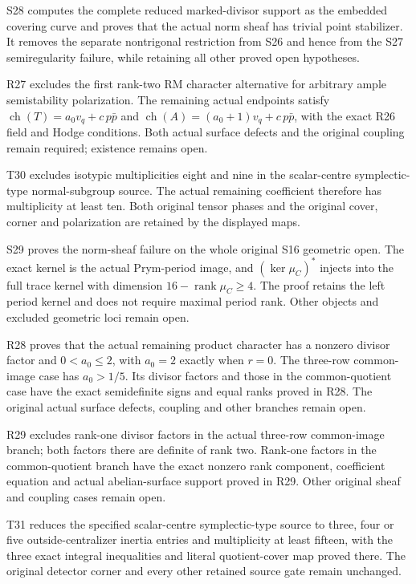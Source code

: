 S28 computes the complete reduced marked-divisor support as the embedded covering curve and proves that the actual norm sheaf has trivial point stabilizer. It removes the separate nontrigonal restriction from S26 and hence from the S27 semiregularity failure, while retaining all other proved open hypotheses.




R27 excludes the first rank-two RM character alternative for arbitrary ample semistability polarization. The remaining actual endpoints satisfy $\operatorname{ch}(T)=a_0v_q+c\,p\bar p$ and $\operatorname{ch}(A)=(a_0+1)v_q+c\,p\bar p$, with the exact R26 field and Hodge conditions. Both actual surface defects and the original coupling remain required; existence remains open.




T30 excludes isotypic multiplicities eight and nine in the scalar-centre symplectic-type normal-subgroup source. The actual remaining coefficient therefore has multiplicity at least ten. Both original tensor phases and the original cover, corner and polarization are retained by the displayed maps.




S29 proves the norm-sheaf failure on the whole original S16 geometric open. The exact kernel is the actual Prym-period image, and $(\ker\mu_C)^*$ injects into the full trace kernel with dimension $16-\operatorname{rank}\mu_C\ge4$. The proof retains the left period kernel and does not require maximal period rank. Other objects and excluded geometric loci remain open.




R28 proves that the actual remaining product character has a nonzero divisor factor and $0<a_0\le2$, with $a_0=2$ exactly when $r=0$. The three-row common-image case has $a_0>1/5$. Its divisor factors and those in the common-quotient case have the exact semidefinite signs and equal ranks proved in R28. The original actual surface defects, coupling and other branches remain open.




R29 excludes rank-one divisor factors in the actual three-row common-image branch; both factors there are definite of rank two. Rank-one factors in the common-quotient branch have the exact nonzero rank component, coefficient equation and actual abelian-surface support proved in R29. Other original sheaf and coupling cases remain open.




T31 reduces the specified scalar-centre symplectic-type source to three, four or five outside-centralizer inertia entries and multiplicity at least fifteen, with the three exact integral inequalities and literal quotient-cover map proved there. The original detector corner and every other retained source gate remain unchanged.




